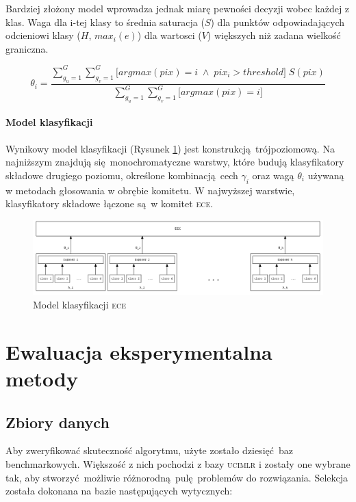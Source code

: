 \documentclass[]{article}
\begin{document}
Bardziej złożony model wprowadza jednak miarę pewności decyzji wobec każdej z klas. Waga dla i-tej klasy to średnia saturacja ($S$) dla punktów odpowiadających odcieniowi klasy ($H$, $max_i(e)$) dla wartosci ($V$) większych niż zadana wielkość graniczna. 

\begin{equation}
	\theta _i = \frac{\sum_{g_u=1}^{G}\sum_{g_v=1}^{G}\Big[ argmax(pix) = i \;\wedge\; pix_i > threshold\Big]\;S(pix)}{\sum_{g_u=1}^{G}\sum_{g_v=1}^{G} \Big[ argmax(pix) = i\Big]} 
\end{equation}

\paragraph{Model klasyfikacji}

Wynikowy model klasyfikacji (Rysunek \ref{fig:model}) jest konstrukcją trójpoziomową. Na najniższym znajdują się monochromatyczne warstwy, które budują klasyfikatory składowe drugiego poziomu, określone kombinacją cech $\gamma_i$ oraz wagą $\theta_i$ używaną w metodach głosowania w obrębie komitetu. W najwyższej warstwie, klasyfikatory składowe łączone są w komitet \textsc{ece}.

\begin{figure}[hbt]
	\center
  \includegraphics[width=\textwidth]{figures/ece_model}
  
  \caption{Model klasyfikacji \textsc{ece}}
	\label{fig:model}
\end{figure}

\section{Ewaluacja eksperymentalna metody}

\subsection{Zbiory danych}

Aby zweryfikować skuteczność algorytmu, użyte zostało dziesięć baz benchmarkowych. Większość z nich pochodzi z bazy \textsc{ucimlr}\cite{asuncion2007uci} i zostały one wybrane tak, aby stworzyć możliwie różnorodną pulę problemów do rozwiązania. Selekcja została dokonana na bazie następujących wytycznych:
\end{document}
